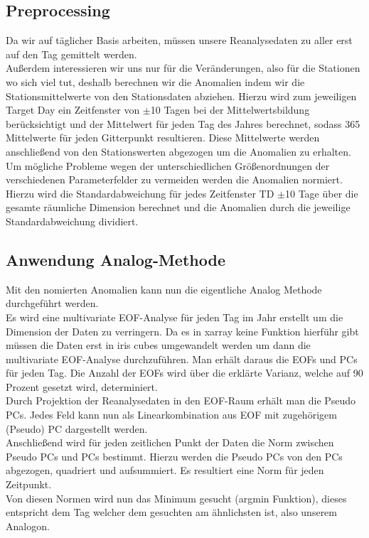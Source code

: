 \documentclass[12pt]{article}
\begin{document}
\subsection{Preprocessing}
Da wir auf täglicher Basis arbeiten, müssen unsere Reanalysedaten zu aller erst auf den Tag gemittelt werden.\\
Außerdem interessieren wir uns nur für die Veränderungen, also für die Stationen wo sich viel tut, deshalb berechnen wir die Anomalien indem wir die 
Stationsmittelwerte von den Stationsdaten abziehen. Hierzu wird zum jeweiligen Target Day ein Zeitfenster von $ \pm $10 Tagen bei der Mittelwertsbildung berücksichtigt und der Mittelwert für jeden Tag des Jahres berechnet, sodass 365 Mittelwerte für jeden Gitterpunkt resultieren. Diese Mittelwerte werden anschließend von den Stationswerten abgezogen um die Anomalien zu erhalten.\\
Um mögliche Probleme wegen der unterschiedlichen Größenordnungen der verschiedenen Parameterfelder zu vermeiden werden die Anomalien normiert. Hierzu wird die Standardabweichung für jedes Zeitfenster TD $\pm$10 Tage über die gesamte räumliche Dimension berechnet und die Anomalien durch die jeweilige Standardabweichung dividiert.\\
\subsection{Anwendung Analog-Methode}
Mit den nomierten Anomalien kann nun die eigentliche Analog Methode durchgeführt werden.\\
Es wird eine multivariate EOF-Analyse für jeden Tag im Jahr erstellt um die Dimension der Daten zu verringern. Da es in xarray keine Funktion hierführ gibt müssen die Daten erst in iris cubes umgewandelt werden um dann die multivariate EOF-Analyse durchzuführen. Man erhält daraus die EOFs und PCs für jeden Tag. Die Anzahl der EOFs wird über die erklärte Varianz, welche auf 90 Prozent gesetzt wird, determiniert.\\
Durch Projektion der Reanalysedaten in den EOF-Raum erhält man die Pseudo PCs. Jedes Feld kann nun als Linearkombination aus EOF mit zugehörigem (Pseudo) PC dargestellt werden.\\
Anschließend wird für jeden zeitlichen Punkt der Daten die Norm zwischen Pseudo PCs und PCs bestimmt. Hierzu werden die Pseudo PCs von den PCs abgezogen, quadriert und aufsummiert. Es resultiert eine Norm für jeden Zeitpunkt.\\ Von diesen Normen wird nun das Minimum gesucht (argmin Funktion), dieses entspricht dem Tag welcher dem gesuchten am ähnlichsten ist, also unserem Analogon.
\end{document}
